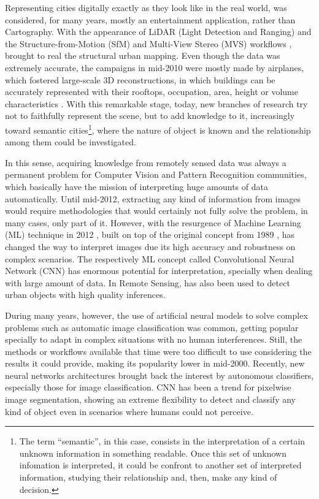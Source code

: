 Representing cities digitally exactly as they look like in the real world, was considered, for many years, mostly an entertainment application, rather than Cartography. With the appearance of LiDAR (Light Detection and Ranging) \cite{vosselman2001} and the Structure-from-Motion (SfM) and Multi-View Stereo (MVS) workflows \cite{snavely2006}, brought to real the structural urban mapping. Even though the data was extremely accurate, the campaigns in mid-2010 were mostly made by airplanes, which fostered large-scale 3D reconstructions, in which buildings can be accurately represented with their rooftops, occupation, area, height or volume characteristics \cite{salehi2017}. With this remarkable stage, today, new branches of research try not to faithfully represent the scene, but to add knowledge to it, increasingly toward semantic cities\footnote{The term \textquotedblleft semantic\textquotedblright, in this case, consists in the interpretation of a certain unknown information in something readable. Once this set of unknown infomation is interpreted, it could be confront to another set of interpreted information, studying their relationship and, then, make any kind of decision.}, where the nature of object is known and the relationship among them could be investigated.

In this sense, acquiring knowledge from remotely sensed data was always a permanent problem for Computer Vision and Pattern Recognition communities, which basically have the mission of interpreting huge amounts of data automatically. Until mid-2012, extracting any kind of information from images would require methodologies that would certainly not fully solve the problem, in many cases, only part of it. However, with the resurgence of Machine Learning (ML) technique in 2012 \cite{krizhevsky2012}, built on top of the original concept from 1989 \cite{lecun1989}, has changed the way to interpret images due its high accuracy and robustness on complex scenarios. The respectively ML concept called Convolutional Neural Network (CNN) has enormous potential for interpretation, specially when dealing with large amount of data. In Remote Sensing, has also been used to detect urban objects \cite{zheng2015, segnet, teichmann2016} with high quality inferences.

During many years, however, the use of artificial neural models to solve complex problems such as automatic image classification was common, getting popular specially to adapt in complex situations with no human interferences. Still, the methods or workflows available that time were too difficult to use considering the results it could provide, making its popularity lower in mid-2000. Recently, new neural networks architectures brought back the interest by autonomous classifiers, especially those for image classification. CNN has been a trend for pixelwise image segmentation, showing an extreme flexibility to detect and classify any kind of object even in scenarios where humans could not perceive.

